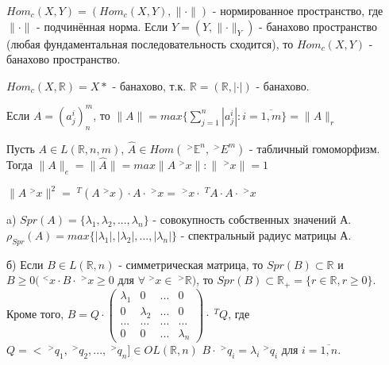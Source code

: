\documentclass[__main__.tex]{subfiles}
\begin{document}
\begin{statement}
    $Hom_c(X,Y) = (Hom_c(X,Y), \lVert \cdot \rVert)$ - нормированное пространство, где $\lVert \cdot \rVert$ - подчинённая норма. Если  $Y = (Y, \lVert \cdot \rVert_Y)$ - банахово пространство (любая фундаментальная последовательность сходится), то $Hom_c(X,Y)$ - банахово пространство.
\end{statement}

\begin{statement}
    $Hom_c(X, \mathbb{R}) = X*$ - банахово, т.к. $\mathbb{R} = (\mathbb{R}, | \cdot |)$ - банахово.
\end{statement}

\begin{statement}
    Если $A = (a^i_j)^m_n$, то $\lVert A \rVert = max \lbrace \sum_{j=1}^{n}| a^i_j | : i=\overline{1,m} \rbrace = \lVert A \rVert_r$
\end{statement}

Пусть $A \in L(\mathbb{R},n,m)$, $\hat{A} \in Hom(\;^{>}\mathbb{E}^n, \;^{>}E^m)$ - табличный гомоморфизм. Тогда $\lVert A \rVert_e  = \lVert \hat{A} \rVert = max {\lVert A \;^{>}x \rVert : \lVert \;^{>}x \rVert = 1}$

$\lVert A \;^{>}x \rVert^2 = \;^{T}(A \;^{>}x) \cdot A \cdot \;^{>}x = \;^{>}x \cdot \;^{T}A \cdot A \cdot \;^{>}x$

\begin{definition}
    a) $Spr(A) = \lbrace \lambda_1, \lambda_2, ... , \lambda_n \rbrace$ - совокупность собственных значений А. $\rho_{Spr}(A) = max \lbrace |\lambda_1|, |\lambda_2|, ... , |\lambda_n| \rbrace$ - спектральный радиус матрицы А.

    б) Если $B \in L(\mathbb{R},n)$ - симметрическая матрица, то $Spr(B) \subset \mathbb{R}$ и $B \geqslant 0 (\;^{<}x \cdot B \cdot \;^{>}x \geqslant 0$ для $\forall \;^{>}x \in \;^{>} \mathbb{R})$, то $Spr(B) \subset \mathbb{R}_+ = \lbrace r \in \mathbb{R}, r \geqslant 0 \rbrace$. Кроме того, $B = Q \cdot \left(
        \begin{matrix}
                \lambda_1 & 0         & ... & 0         \\
                0         & \lambda_2 & ... & 0         \\
                ...       & ...       & ... & ...       \\
                0         & 0         & ... & \lambda_n
            \end{matrix}
        \right) \cdot \;^{T}Q$, где $Q = < \;^{>}q_1, \;^{>}q_2, ... , \;^{>}q_n] \in OL(\mathbb{R},n)$
    $B \cdot \;^{>}q_i = \lambda_i \;^{>}q_i$ для $i=\overline{1,n}$.
\end{definition}
\end{document}
